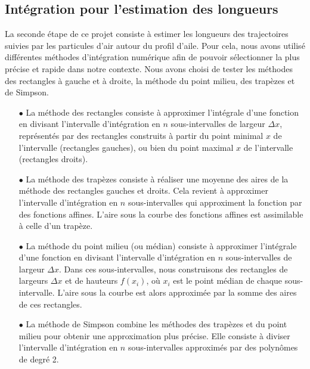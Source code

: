 \documentclass{article}
\begin{document}
\subsection{Intégration pour l'estimation des longueurs}
La seconde étape de ce projet consiste à estimer les longueurs des trajectoires suivies par les particules d'air autour du profil d'aile. Pour cela, nous avons utilisé différentes méthodes d'intégration numérique afin de pouvoir sélectionner la plus précise et rapide dans notre contexte. Nous avons choisi de tester les méthodes des rectangles à gauche et à droite, la méthode du point milieu, des trapèzes et de Simpson.\\
\begin{itemize}
  \item[$\bullet$] La méthode des rectangles consiste à approximer l'intégrale d'une fonction en divisant l'intervalle d'intégration en $n$ sous-intervalles de largeur $\Delta x$, représentés par des rectangles construits à partir du point minimal $x$ de l'intervalle (rectangles gauches), ou bien du point maximal $x$ de l'intervalle (rectangles droits).
  \item[$\bullet$] La méthode des trapèzes consiste à réaliser une moyenne des aires de la méthode des rectangles gauches et droits. Cela revient à approximer l'intervalle d'intégration en $n$ sous-intervalles qui approximent la fonction par des fonctions affines. L'aire sous la courbe des fonctions affines est assimilable à celle d'un trapèze.
  \item[$\bullet$] La méthode du point milieu (ou médian) consiste à approximer l'intégrale d'une fonction en divisant l'intervalle d'intégration en $n$ sous-intervalles de largeur $\Delta x$. Dans ces sous-intervalles, nous construisons des rectangles de largeurs $\Delta x$ et de hauteurs $f(x_i)$, où $x_i$ est le point médian de chaque sous-intervalle. L'aire sous la courbe est alors approximée par la somme des aires de ces rectangles.
  \item[$\bullet$] La méthode de Simpson combine les méthodes des trapèzes et du point milieu pour obtenir une approximation plus précise.
  Elle consiste à diviser l'intervalle d'intégration en $n$ sous-intervalles approximés par des polynômes de degré 2.\\
\end{itemize}
\end{document}
